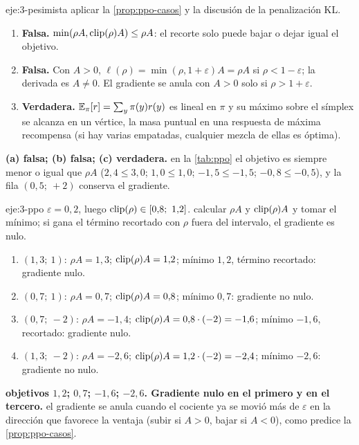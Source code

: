 \begin{solucion}{eje:3-pesimista}
\planteamiento aplicar la \cref{prop:ppo-casos} y la discusión de la penalización KL.
\pasos
\begin{enumerate}[label=(\alph*)]
  \item \textbf{Falsa.} $\min(\rho A,\operatorname{clip}(\rho)A)\le\rho A$: el recorte solo puede bajar o dejar igual el objetivo.
  \item \textbf{Falsa.} Con $A>0$, $\ell(\rho)=\min(\rho,1+\varepsilon)A=\rho A$ si $\rho<1-\varepsilon$; la derivada es $A\neq 0$. El gradiente se anula con $A>0$ solo si $\rho>1+\varepsilon$.
  \item \textbf{Verdadera.} $\mathbb{E}_\pi[r]=\sum_y\pi(y)r(y)$ es lineal en $\pi$ y su máximo sobre el símplex se alcanza en un vértice, la masa puntual en una respuesta de máxima recompensa (si hay varias empatadas, cualquier mezcla de ellas es óptima).
\end{enumerate}
\resultado \textbf{(a) falsa; (b) falsa; (c) verdadera.}
\comprobacion en la \cref{tab:ppo} el objetivo es siempre menor o igual que $\rho A$ ($2{,}4\le3{,}0$; $1{,}0\le1{,}0$; $-1{,}5\le-1{,}5$; $-0{,}8\le-0{,}5$), y la fila $(0{,}5;\ +2)$ conserva el gradiente.
\end{solucion}

\begin{solucion}{eje:3-ppo}
\datos $\varepsilon=0{,}2$, luego $\operatorname{clip}(\rho)\in[0{,}8;\ 1{,}2]$.
\planteamiento calcular $\rho A$ y $\operatorname{clip}(\rho)A$ y tomar el mínimo; si gana el término recortado con $\rho$ fuera del intervalo, el gradiente es nulo.
\pasos
\begin{enumerate}[label=\arabic*.]
  \item $(1{,}3;\ 1)$: $\rho A=1{,}3$; $\operatorname{clip}(\rho)A=1{,}2$; mínimo $1{,}2$, término recortado: gradiente nulo.
  \item $(0{,}7;\ 1)$: $\rho A=0{,}7$; $\operatorname{clip}(\rho)A=0{,}8$; mínimo $0{,}7$: gradiente no nulo.
  \item $(0{,}7;\ -2)$: $\rho A=-1{,}4$; $\operatorname{clip}(\rho)A=0{,}8\cdot(-2)=-1{,}6$; mínimo $-1{,}6$, recortado: gradiente nulo.
  \item $(1{,}3;\ -2)$: $\rho A=-2{,}6$; $\operatorname{clip}(\rho)A=1{,}2\cdot(-2)=-2{,}4$; mínimo $-2{,}6$: gradiente no nulo.
\end{enumerate}
\resultado \textbf{objetivos $1{,}2$; $0{,}7$; $-1{,}6$; $-2{,}6$. Gradiente nulo en el primero y en el tercero.}
\comprobacion el gradiente se anula cuando el cociente ya se movió más de $\varepsilon$ en la dirección que favorece la ventaja (subir si $A>0$, bajar si $A<0$), como predice la \cref{prop:ppo-casos}.
\end{solucion}

